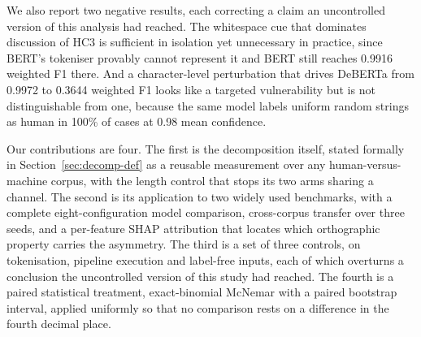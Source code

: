 We also report two negative results, each correcting a claim an uncontrolled version of this analysis had reached. The whitespace cue that dominates discussion of HC3 is sufficient in isolation yet unnecessary in practice, since BERT's tokeniser provably cannot represent it and BERT still reaches 0.9916 weighted F1 there. And a character-level perturbation that drives DeBERTa from 0.9972 to 0.3644 weighted F1 looks like a targeted vulnerability but is not distinguishable from one, because the same model labels uniform random strings as human in 100\% of cases at 0.98 mean confidence.

Our contributions are four. The first is the decomposition itself, stated formally in Section~\ref{sec:decomp-def} as a reusable measurement over any human-versus-machine corpus, with the length control that stops its two arms sharing a channel. The second is its application to two widely used benchmarks, with a complete eight-configuration model comparison, cross-corpus transfer over three seeds, and a per-feature SHAP attribution that locates which orthographic property carries the asymmetry. The third is a set of three controls, on tokenisation, pipeline execution and label-free inputs, each of which overturns a conclusion the uncontrolled version of this study had reached. The fourth is a paired statistical treatment, exact-binomial McNemar with a paired bootstrap interval, applied uniformly so that no comparison rests on a difference in the fourth decimal place.
